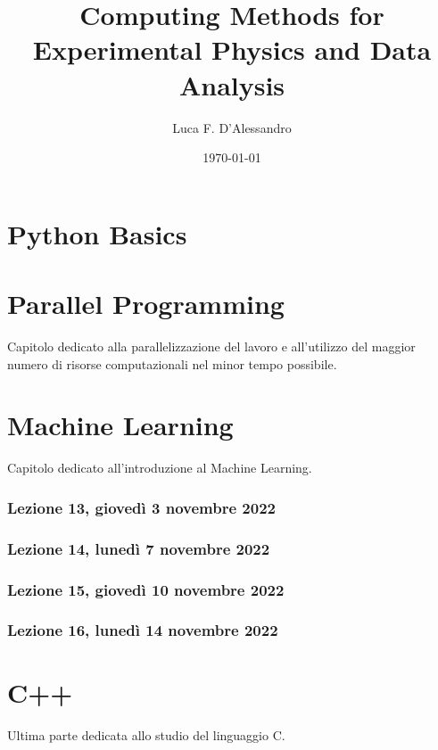 \documentclass[10pt, a4paper, titlepage]{book}
\title{Computing Methods for Experimental Physics and Data Analysis}
\author{Luca F. D'Alessandro}
\date{\today}
\begin{document}
\maketitle

\tableofcontents


\chapter{Python Basics}





\chapter{Parallel Programming}

Capitolo dedicato alla parallelizzazione del lavoro e all'utilizzo del maggior numero di risorse computazionali nel minor tempo possibile.



\chapter{Machine Learning}

Capitolo dedicato all'introduzione al Machine Learning.

\subsection{Lezione 13, giovedì 3 novembre 2022}



\subsection{Lezione 14, lunedì 7 novembre 2022}



\subsection{Lezione 15, giovedì 10 novembre 2022}



\subsection{Lezione 16, lunedì 14 novembre 2022}



\chapter{C++}

Ultima parte dedicata allo studio del linguaggio C.
\end{document}
